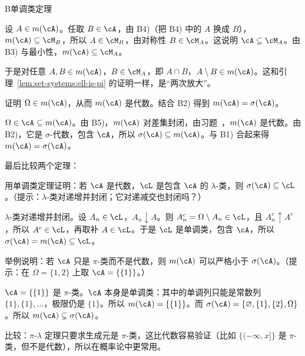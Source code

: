 \begin{probleme}{B}{单调类定理}
\begin{questions}
\begin{solution}
设 $A\in m(\cA)$。任取 $B\in\cA$，由 B4)（把 B4) 中的 $A$ 换成 $B$），$m(\cA)\subseteq\cM_B$，所以 $A\in\cM_B$，由对称性 $B\in\cM_A$。这说明 $\cA\subseteq\cM_A$。由 B3) 与最小性，$m(\cA)\subseteq\cM_A$。

于是对任意 $A,B\in m(\cA)$，$B\in\cM_A$，即 $A\cap B$，$A\setminus B\in m(\cA)$。这和引理~\ref{lem:set-systems:ell-is-pi} 的证明一样，是“两次放大”。
\end{solution}
\item 证明 $\Omega\in m(\cA)$，从而 $m(\cA)$ 是代数。结合 B2) 得到 $m(\cA)=\sigma(\cA)$。
\begin{solution}
$\Omega\in\cA\subseteq m(\cA)$。由 B5)，$m(\cA)$ 对差集封闭，由习题~，$m(\cA)$ 是代数。由 B2)，它是 $\sigma$-代数，包含 $\cA$，所以 $\sigma(\cA)\subseteq m(\cA)$。与 B1) 合起来得 $m(\cA)=\sigma(\cA)$。
\end{solution}
\end{questions}
最后比较两个定理：
\begin{questions}[resume]
\item 用单调类定理证明：若 $\cA$ 是代数，$\cL$ 是包含 $\cA$ 的 $\lambda$-类，则 $\sigma(\cA)\subseteq\cL$。（提示：$\lambda$-类对递增并封闭；它对递减交也封闭吗？）
\begin{solution}
$\lambda$-类对递增并封闭。设 $A_n\in\cL$，$A_n\downarrow A$。则 $A_n^c=\Omega\setminus A_n\in\cL$，且 $A_n^c\uparrow A^c$，所以 $A^c\in\cL$，再取补 $A\in\cL$。于是 $\cL$ 是单调类，包含 $\cA$，所以 $\sigma(\cA)=m(\cA)\subseteq\cL$。
\end{solution}
\item 举例说明：若 $\cA$ 只是 $\pi$-类而不是代数，则 $m(\cA)$ 可以严格小于 $\sigma(\cA)$。（提示：在 $\Omega=\{1,2\}$ 上取 $\cA=\{\{1\}\}$。）
\begin{solution}
$\cA=\{\{1\}\}$ 是 $\pi$-类。$\cA$ 本身是单调类：其中的单调列只能是常数列 $\{1\},\{1\},\dots$，极限仍是 $\{1\}$。所以 $m(\cA)=\{\{1\}\}$。而 $\sigma(\cA)=\{\varnothing,\{1\},\{2\},\Omega\}$。所以 $m(\cA)\subsetneq\sigma(\cA)$。

比较：$\pi$-$\lambda$ 定理只要求生成元是 $\pi$-类，这比代数容易验证（比如 $\{(-\infty,x]\}$ 是 $\pi$-类，但不是代数），所以在概率论中更常用。
\end{solution}
\end{questions}
\end{probleme}

